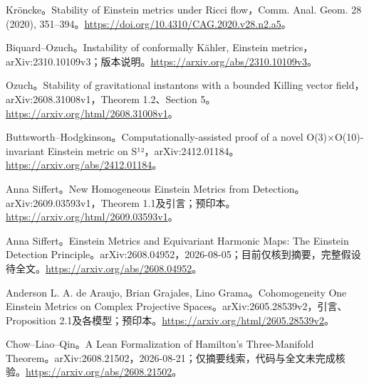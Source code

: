 \documentclass[11pt,a4paper]{article}
\theoremstyle{definition}
\begin{document}
\begin{enumerate}[label={[\arabic*]},leftmargin=2.2em,itemsep=0.55em]
\item Kröncke。Stability of Einstein metrics under Ricci flow，Comm. Anal. Geom. 28 (2020), 351--394。\url{https://doi.org/10.4310/CAG.2020.v28.n2.a5}。
\item Biquard--Ozuch。Instability of conformally Kähler, Einstein metrics，arXiv:2310.10109v3；版本说明。\url{https://arxiv.org/abs/2310.10109v3}。
\item Ozuch。Stability of gravitational instantons with a bounded Killing vector field，arXiv:2608.31008v1，Theorem 1.2、Section 5。\url{https://arxiv.org/html/2608.31008v1}。
\item Buttsworth--Hodgkinson。Computationally-assisted proof of a novel O(3)×O(10)-invariant Einstein metric on S¹²，arXiv:2412.01184。\url{https://arxiv.org/abs/2412.01184}。
\item Anna Siffert。New Homogeneous Einstein Metrics from Detection。arXiv:2609.03593v1，Theorem 1.1及引言；预印本。\url{https://arxiv.org/html/2609.03593v1}。
\item Anna Siffert。Einstein Metrics and Equivariant Harmonic Maps: The Einstein Detection Principle。arXiv:2608.04952，2026-08-05；目前仅核到摘要，完整假设待全文。\url{https://arxiv.org/abs/2608.04952}。
\item Anderson L. A. de Araujo, Brian Grajales, Lino Grama。Cohomogeneity One Einstein Metrics on Complex Projective Spaces。arXiv:2605.28539v2，引言、Proposition 2.1及各模型；预印本。\url{https://arxiv.org/html/2605.28539v2}。
\item Chow--Liao--Qin。A Lean Formalization of Hamilton's Three-Manifold Theorem。arXiv:2608.21502，2026-08-21；仅摘要线索，代码与全文未完成核验。\url{https://arxiv.org/abs/2608.21502}。
\end{enumerate}
\end{document}
